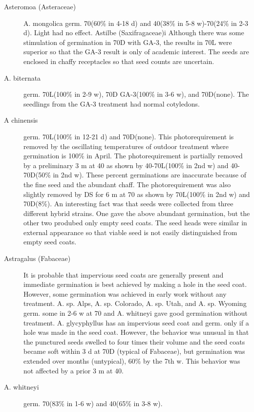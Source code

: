 \begin{description}
\item[Asteromoa (Asteraceae)] A. mongolica germ. 70(60\% in 4-18 d) and
40(38\% in 5-8 w)-70(24\% in 2-3 d). Light had no effect.
Astilbe (Saxifragaceae)i Although there was some stimulation of
germination in 70D with GA-3, the results in 70L were superior so that the GA-3 result
is only of academic interest. The seeds are enclosed in chaffy receptacles so that
seed counts are uncertain.

\item[A. biternata] germ. 70L(100\% in 2-9 w), 70D GA-3(100\% in 3-6 w), and
70D(none). The seedlings from the GA-3 treatment had normal cotyledons.
\item[A chinensis] germ. 70L(100\% in 12-21 d) and 70D(none). This
photorequirement is removed by the oscillating temperatures of outdoor treatment
where germination is 100\% in April. The photorequirement is partially removed by a
preliminary 3 m at 40 as shown by 40-70L(100\% in 2nd w) and 40-70D(50\% in 2nd
w). These percent germinations are inaccurate because of the fine seed and the
abundant chaff. The photorequirement was also slightly removed by DS for 6 m at 70
as shown by 70L(100\% in 2nd w) and 70D(8\%). An interesting fact was that seeds
were collected from three different hybrid strains. One gave the above abundant
germination, but the other two produbed only empty seed coats. The seed heads were
similar in external appearance so that viable seed is not easily distinguished from
empty seed coats.

\item[Astragalus (Fabaceae)] It is probable that impervious seed coats are
generally present and immediate germination is best achieved by making a hole in the
seed coat. However, some germination was achieved in early work without any
treatment. A. sp. Alps, A. sp. Colorado, A. sp. Utah, and A. sp. Wyoming germ. some in
2-6 w at 70 and A. whitneyi gave good germination without treatment.
A. glycyphyllus has an impervious seed coat and germ. only if a hole was made
in the seed coat. However, the behavior was unusual in that the punctured seeds
swelled to four times their volume and the seed coats became soft within 3 d at 70D
(typical of Fabaceae), but germination was extended over months (untypical), 60\% by
the 7th w. This behavior was not affected by a prior 3 m at 40.
\item[A. whitneyi] germ. 70(83\% in 1-6 w) and 40(65\% in 3-8 w).


\end{description}
